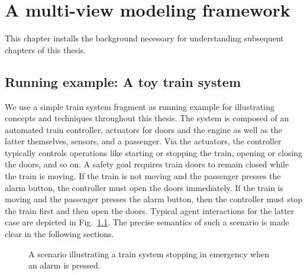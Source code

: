 \chapter{A multi-view modeling framework\label{chapter:framework}}

This chapter installs the background necessary for understanding subsequent chapters of this thesis. 

\newcommand{\artifact}[1]{\texttt{#1}}

\section{Running example: A toy train system}

We use a simple train system fragment as running example for illustrating concepts and techniques throughout this thesis. The system is composed of an automated train controller, actuators for doors and the engine as well as the latter themselves, sensors, and a passenger. Via the actuators, the controller typically controls operations like starting or stopping the train, opening or closing the doors, and so on. A safety goal requires train doors to remain closed while the train is moving. If the train is not moving and the passenger presses the alarm button, the controller must open the doors immediately. If the train is moving and the passenger presses the alarm button, then the controller must stop the train first and then open the doors. Typical agent interactions for the latter case are depicted in Fig.~\ref{image:train-scenario-all-agents}. The precise semantics of such a scenario is made clear in the following sections.

\begin{figure}[H]\centering
{}
\caption{A scenario illustrating a train system stopping in emergency when an alarm is pressed.\label{image:train-scenario-all-agents}}
\end{figure}

